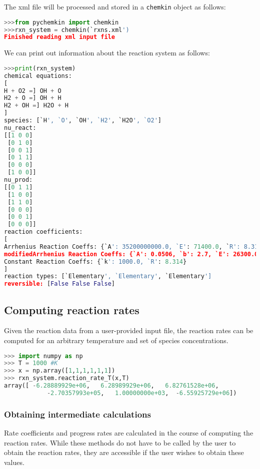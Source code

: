 \documentclass[12pt]{article}
\begin{document}
The xml file will be processed and stored in a {\tt chemkin} object as follows:
\begin{lstlisting}[language = Python, basicstyle = \ttfamily, breaklines = True, columns = fullflexible]
>>>from pychemkin import chemkin
>>>rxn_system = chemkin(`rxns.xml')
Finished reading xml input file
\end{lstlisting}

We can print out information about the reaction system as follows:
\begin{lstlisting}[language = Python, basicstyle = \ttfamily,columns = fullflexible, showstringspaces = False]
>>>print(rxn_system)
chemical equations:
[
H + O2 =] OH + O
H2 + O =] OH + H
H2 + OH =] H2O + H
]
species: [`H', `O', `OH', `H2', `H2O', `O2']
nu_react:
[[1 0 0]
 [0 1 0]
 [0 0 1]
 [0 1 1]
 [0 0 0]
 [1 0 0]]
nu_prod:
[[0 1 1]
 [1 0 0]
 [1 1 0]
 [0 0 0]
 [0 0 1]
 [0 0 0]]
reaction coefficients:
[
Arrhenius Reaction Coeffs: {`A': 35200000000.0, `E': 71400.0, `R': 8.314}
modifiedArrhenius Reaction Coeffs: {`A': 0.0506, `b': 2.7, `E': 26300.0, `R': 8.314}
Constant Reaction Coeffs: {`k': 1000.0, `R': 8.314}
]
reaction types: [`Elementary', `Elementary', `Elementary']
reversible: [False False False]
\end{lstlisting}


\subsection{Computing reaction rates}
Given the reaction data from a user-provided input file, the reaction rates can be computed for an arbitrary temperature and set of species concentrations.

\begin{lstlisting}[language = Python, basicstyle = \ttfamily,columns = fullflexible, showstringspaces = False]
>>> import numpy as np
>>> T = 1000 #K
>>> x = np.array([1,1,1,1,1,1])
>>> rxn_system.reaction_rate_T(x,T)
array([ -6.28889929e+06,   6.28989929e+06,   6.82761528e+06,
            -2.70357993e+05,   1.00000000e+03,  -6.55925729e+06])
\end{lstlisting}

\subsubsection{Obtaining intermediate calculations}
Rate coefficients and progress rates are calculated in the course of computing the reaction rates. While these methods do not have to be called by the user to obtain the reaction rates, they are accessible if the user wishes to obtain these values. 
\end{document}
